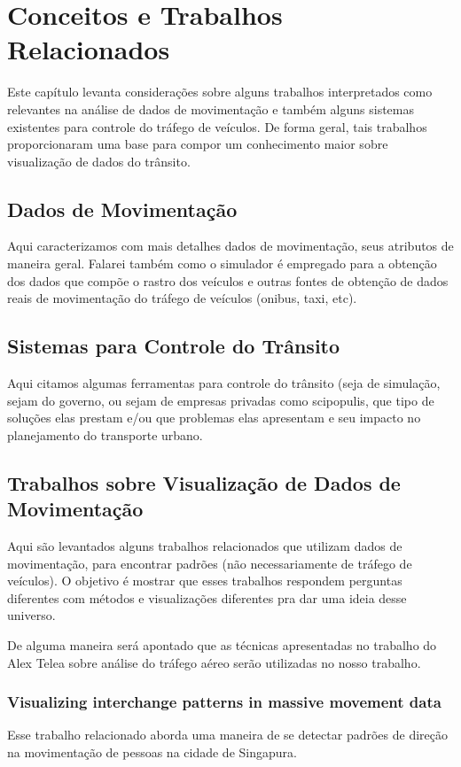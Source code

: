 \chapter{Conceitos e Trabalhos Relacionados}
\label{cap:trabalhos-relacionados}

Este capítulo levanta considerações sobre alguns trabalhos interpretados como
relevantes na análise de dados de movimentação e também alguns sistemas existentes
para controle do tráfego de veículos. De forma geral, tais trabalhos proporcionaram uma base
para compor um conhecimento maior sobre visualização de dados do trânsito.

\section{Dados de Movimentação}

Aqui caracterizamos com mais detalhes dados de movimentação, seus atributos
de maneira geral. Falarei também como o simulador é empregado para a obtenção
dos dados que compõe o rastro dos veículos e outras fontes de obtenção de dados
reais de movimentação do tráfego de veículos (onibus, taxi, etc).

\section{Sistemas para Controle do Trânsito}

Aqui citamos algumas ferramentas para controle do trânsito (seja de simulação, sejam do governo, ou
sejam de empresas privadas como scipopulis, que tipo de soluções elas prestam e/ou
que problemas elas apresentam e seu impacto no planejamento do transporte urbano.

\section{Trabalhos sobre Visualização de Dados de Movimentação}

Aqui são levantados alguns trabalhos relacionados que utilizam dados de movimentação,
para encontrar padrões (não necessariamente de tráfego de veículos). O objetivo
é mostrar que esses trabalhos respondem perguntas diferentes com métodos
e visualizações diferentes pra dar uma ideia desse universo.

De alguma maneira será apontado que as técnicas apresentadas no trabalho do
Alex Telea sobre análise do tráfego aéreo serão utilizadas no nosso trabalho.

\subsection{Visualizing interchange patterns in massive movement data}
 Esse trabalho relacionado aborda uma maneira de se detectar padrões de direção
na movimentação de pessoas na cidade de Singapura.

